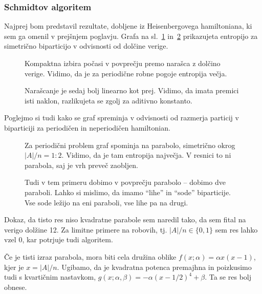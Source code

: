 \documentclass[12pt, a4paper]{article}
\begin{document}
\subsubsection{Schmidtov algoritem}

Najprej bom predstavil rezultate, dobljene iz Heisenbergovega hamiltoniana, ki sem ga omenil v
prej\v snjem poglavju. Grafa na sl.~\ref{1-kompakten} in~\ref{1-nekompakten} prikazujeta entropijo
za simetri\v cno biparticijo v odvisnosti od dol\v cine verige.

\begin{figure}[H]\centering
	
	\caption{Kompaktna izbira po\v casi v povpre\v cju premo nara\v sca z dol\v cino verige.
		Vidimo, da je za periodi\v cne robne pogoje entropija ve\v cja.}
	\label{1-kompakten}
\end{figure}

\begin{figure}[H]\centering
	
	\caption{Nara\v scanje je sedaj bolj linearno kot prej. Vidimo, da imata premici isti naklon,
		razlikujeta se zgolj za aditivno konstanto.}
	\label{1-nekompakten}
\end{figure}

Poglejmo si tudi kako se graf spreminja v odvisnosti od razmerja particij v biparticiji za periodi\v cen in
neperiodi\v cen hamiltonian.

\begin{figure}[H]\centering
	
	\caption{Za periodi\v cni problem graf spominja na parabolo, simetri\v cno okrog $|A|/n = 1:2$. Vidimo, da je
		tam entropija najve\v cja. V resnici to ni parabola, saj je vrh preve\v c zaobljen.}
	\label{1-periodicni-aji}
\end{figure}

\begin{figure}[H]\centering
	
	\caption{Tudi v tem primeru dobimo v povpre\v cju parabolo -- dobimo dve paraboli. Lahko si mislimo, da imamo
		"`lihe"' in "`sode"' biparticije. Vse sode le\v zijo na eni paraboli, vse lihe pa na drugi.}
	\label{1-neperiodicni-aji}
\end{figure}

Dokaz, da tisto res niso kvadratne parabole sem naredil tako, da sem fital na verigo dol\v zine 12. Za limitne primere na
robovih, tj. $|A|/n \in \{0,1\}$ sem res lahko vzel $0$, kar potrjuje tudi algoritem.

\v Ce je tisti izraz parabola, mora biti cela dru\v zina oblike $f(x;\alpha) = \alpha x(x-1)$, kjer je $x = |A|/n$. Ugibamo,
da je kvadratna potenca premajhna in poizkusimo tudi s kvarti\v cnim nastavkom, $g(x;\alpha,\beta) = -\alpha(x-1/2)^4 + \beta$.
Ta se res bolj obnese.
\end{document}
